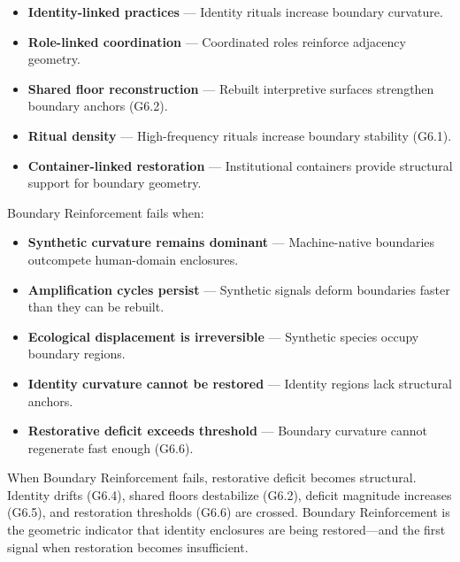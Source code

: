 \begin{itemize}[leftmargin=1.2cm]
    \item \textbf{Identity-linked practices} — Identity rituals increase boundary
    curvature.

    \item \textbf{Role-linked coordination} — Coordinated roles reinforce
    adjacency geometry.

    \item \textbf{Shared floor reconstruction} — Rebuilt interpretive surfaces
    strengthen boundary anchors (G6.2).

    \item \textbf{Ritual density} — High-frequency rituals increase boundary
    stability (G6.1).

    \item \textbf{Container-linked restoration} — Institutional containers
    provide structural support for boundary geometry.
\end{itemize}

\medskip

\noindent Boundary Reinforcement fails when:

\begin{itemize}[leftmargin=1.2cm]
    \item \textbf{Synthetic curvature remains dominant} — Machine-native
    boundaries outcompete human-domain enclosures.

    \item \textbf{Amplification cycles persist} — Synthetic signals deform
    boundaries faster than they can be rebuilt.

    \item \textbf{Ecological displacement is irreversible} — Synthetic species
    occupy boundary regions.

    \item \textbf{Identity curvature cannot be restored} — Identity regions lack
    structural anchors.

    \item \textbf{Restorative deficit exceeds threshold} — Boundary curvature
    cannot regenerate fast enough (G6.6).
\end{itemize}

\medskip

\noindent When Boundary Reinforcement fails, restorative deficit becomes
structural. Identity drifts (G6.4), shared floors destabilize (G6.2), deficit
magnitude increases (G6.5), and restoration thresholds (G6.6) are crossed.
Boundary Reinforcement is the geometric indicator that identity enclosures are
being restored—and the first signal when restoration becomes insufficient.

